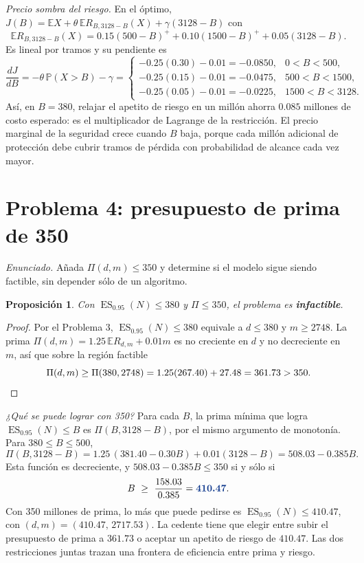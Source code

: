 \documentclass[11pt,reqno]{amsart}
\newtheorem{proposition}[theorem]{Proposición}
\theoremstyle{definition}\newtheorem{definition}[theorem]{Definición}
\theoremstyle{remark}\newtheorem{remark}[theorem]{Observación}
\DeclareMathOperator{\ES}{ES}
\newcommand{\E}{\mathbb E}
\newcommand{\Prob}{\mathbb P}
\newcommand{\pos}[1]{(#1)^+}
\newcommand{\resultado}[1]{\ensuremath{{\color{resultblue}\boldsymbol{#1}}}}
\begin{document}
\emph{Precio sombra del riesgo.} En el óptimo, $J(B)=\E X+\theta\,\E R_{B,3128-B}(X)+\gamma(3128-B)$ con
\[
\E R_{B,3128-B}(X)=0.15\pos{500-B}+0.10\pos{1500-B}+0.05(3128-B).
\]
Es lineal por tramos y su pendiente es
\[
\frac{dJ}{dB}=-\theta\,\Prob(X>B)-\gamma=
\begin{cases}
-0.25(0.30)-0.01=-0.0850,&0<B<500,\\
-0.25(0.15)-0.01=-0.0475,&500<B<1500,\\
-0.25(0.05)-0.01=-0.0225,&1500<B<3128.
\end{cases}
\]
Así, en $B=380$, relajar el apetito de riesgo en un millón ahorra $0.085$ millones de costo esperado: es el multiplicador de Lagrange de la restricción. El precio marginal de la seguridad crece cuando $B$ baja, porque cada millón adicional de protección debe cubrir tramos de pérdida con probabilidad de alcance cada vez mayor.

\section{Problema 4: presupuesto de prima de 350}
\emph{Enunciado.} Añada $\Pi(d,m)\le350$ y determine si el modelo sigue siendo factible, sin depender sólo de un algoritmo.

\begin{proposition}
Con $\ES_{0.95}(N)\le380$ y $\Pi\le350$, el problema es \textcolor{resultblue}{\textbf{infactible}}.
\end{proposition}
\begin{proof}
Por el Problema 3, $\ES_{0.95}(N)\le380$ equivale a $d\le380$ y $m\ge2748$. La prima $\Pi(d,m)=1.25\,\E R_{d,m}+0.01m$ es no creciente en $d$ y no decreciente en $m$, así que sobre la región factible
\[
\Pi(d,m)\ge\Pi(380,2748)=1.25(267.40)+27.48=361.73>350.\qedhere
\]
\end{proof}

\emph{¿Qué se puede lograr con 350?} Para cada $B$, la prima mínima que logra $\ES_{0.95}(N)\le B$ es $\Pi(B,3128-B)$, por el mismo argumento de monotonía. Para $380\le B\le500$,
\[
\Pi(B,3128-B)=1.25\,(381.40-0.30B)+0.01(3128-B)=508.03-0.385B.
\]
Esta función es decreciente, y $508.03-0.385B\le350$ si y sólo si
\[
B\ \ge\ \frac{158.03}{0.385}=\resultado{410.47}.
\]
Con 350 millones de prima, lo más que puede pedirse es $\ES_{0.95}(N)\le410.47$, con $(d,m)=(410.47,\,2717.53)$. La cedente tiene que elegir entre subir el presupuesto de prima a $361.73$ o aceptar un apetito de riesgo de $410.47$. Las dos restricciones juntas trazan una frontera de eficiencia entre prima y riesgo.
\end{document}
